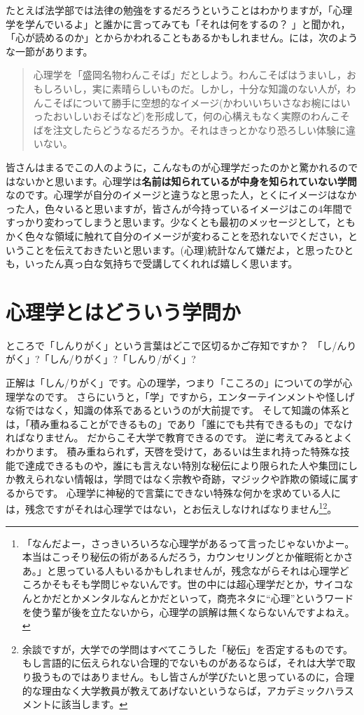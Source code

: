\documentclass{ltjsbook}
\begin{document}
たとえば法学部では法律の勉強をするだろうということはわかりますが，「心理学を学んでいるよ」と誰かに言ってみても「それは何をするの？ 」と聞かれ，「心が読めるのか」とからかわれることもあるかもしれません。\citet{Michimata200903}には，次のような一節があります。

\begin{quote}
	心理学を「盛岡名物わんこそば」だとしよう。わんこそばはうまいし，おもしろいし，実に素晴らしいものだ。しかし，十分な知識のない人が，わんこそばについて勝手に空想的なイメージ(かわいいちいさなお椀にはいったおいしいおそばなど)を形成して，何の心構えもなく実際のわんこそばを注文したらどうなるだろうか。それはきっとかなり恐ろしい体験に違いない。
\end{quote}

皆さんはまるでこの人のように，こんなものが心理学だったのかと驚かれるのではないかと思います。心理学は\textbf{名前は知られているが中身を知られていない学問}なのです。心理学が自分のイメージと違うなと思った人，とくにイメージはなかった人，色々いると思いますが，皆さんが今持っているイメージはこの4年間ですっかり変わってしまうと思います。少なくとも最初のメッセージとして，ともかく色々な領域に触れて自分のイメージが変わることを恐れないでください，ということを伝えておきたいと思います。(心理)統計なんて嫌だよ，と思ったひとも，いったん真っ白な気持ちで受講してくれれば嬉しく思います。

\section{心理学とはどういう学問か}

ところで「しんりがく」という言葉はどこで区切るかご存知ですか？ 「し/んりがく」?「しん/りがく」?「しんり/がく」?

正解は「しん/りがく」です。心の理学，つまり「こころの」についての学が心理学なのです。
さらにいうと，「学」ですから，エンターテインメントや怪しげな術ではなく，知識の体系であるというのが大前提です。
そして知識の体系とは，「積み重ねることができるもの」であり「誰にでも共有できるもの」でなければなりません。
だからこそ大学で教育できるのです。
逆に考えてみるとよくわかります。
積み重ねられず，天啓を受けて，あるいは生まれ持った特殊な技能で達成できるものや，誰にも言えない特別な秘伝により限られた人や集団にしか教えられない情報は，学問ではなく宗教や奇跡，マジックや詐欺の領域に属するからです。
心理学に神秘的で言葉にできない特殊な何かを求めている人には，残念ですがそれは心理学ではない，とお伝えしなければなりません\footnote{「なんだよー，さっきいろいろな心理学があるって言ったじゃないかよー。本当はこっそり秘伝の術があるんだろう，カウンセリングとか催眠術とかさあ。」と思っている人もいるかもしれませんが，残念ながらそれは心理学どころかそもそも学問じゃないんです。世の中には超心理学だとか，サイコなんとかだとかメンタルなんとかだといって，商売ネタに``心理''というワードを使う輩が後を立たないから，心理学の誤解は無くならないんですよねえ。}\footnote{余談ですが，大学での学問はすべてこうした「秘伝」を否定するものです。もし言語的に伝えられない合理的でないものがあるならば，それは大学で取り扱うものではありません。もし皆さんが学びたいと思っているのに，合理的な理由なく大学教員が教えてあげないというならば，アカデミックハラスメントに該当します。}。
\end{document}
